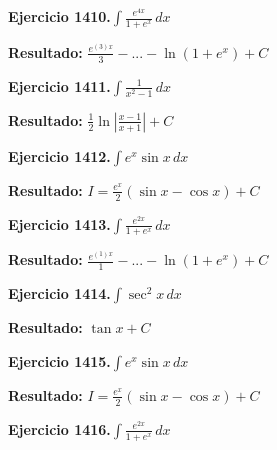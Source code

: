 \documentclass[10pt,a4paper]{article}
\begin{document}
\begin{ejbox}
\textbf{Ejercicio 1410.}\quad $\int \frac{e^{4x}}{1+e^{x}}\,dx$
\end{ejbox}

\begin{solbox}
\textbf{Resultado:} \(\displaystyle \frac{e^{(3)x}}{3} - ... - \ln(1+e^x) + C\)
\end{solbox}

\newpage
\begin{ejbox}
\textbf{Ejercicio 1411.}\quad $\int \frac{1}{x^2-1}\,dx$
\end{ejbox}

\begin{solbox}
\textbf{Resultado:} \(\displaystyle \frac{1}{2}\ln\left|\frac{x-1}{x+1}\right| + C\)
\end{solbox}

\begin{ejbox}
\textbf{Ejercicio 1412.}\quad $\int e^x\sin x\,dx$
\end{ejbox}

\begin{solbox}
\textbf{Resultado:} \(\displaystyle I = \frac{e^x}{2}(\sin x - \cos x) + C\)
\end{solbox}

\begin{ejbox}
\textbf{Ejercicio 1413.}\quad $\int \frac{e^{2x}}{1+e^{x}}\,dx$
\end{ejbox}

\begin{solbox}
\textbf{Resultado:} \(\displaystyle \frac{e^{(1)x}}{1} - ... - \ln(1+e^x) + C\)
\end{solbox}

\newpage
\begin{ejbox}
\textbf{Ejercicio 1414.}\quad $\int \sec^2 x\,dx$
\end{ejbox}

\begin{solbox}
\textbf{Resultado:} \(\displaystyle \tan x + C\)
\end{solbox}

\begin{ejbox}
\textbf{Ejercicio 1415.}\quad $\int e^x\sin x\,dx$
\end{ejbox}

\begin{solbox}
\textbf{Resultado:} \(\displaystyle I = \frac{e^x}{2}(\sin x - \cos x) + C\)
\end{solbox}

\begin{ejbox}
\textbf{Ejercicio 1416.}\quad $\int \frac{e^{2x}}{1+e^{x}}\,dx$
\end{ejbox}
\end{document}
